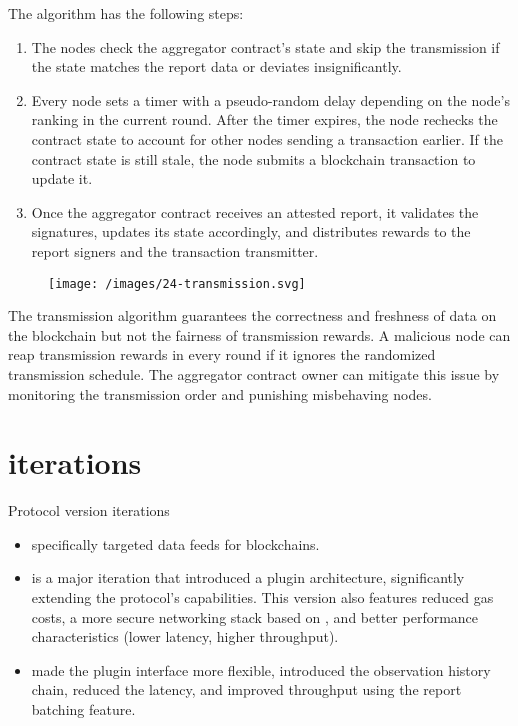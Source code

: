 \documentclass{article}
\begin{document}
The algorithm has the following steps:
\begin{enumerate}
    \item The nodes check the aggregator contract's state and skip the transmission if the state matches the report data or deviates insignificantly.
    \item Every node sets a timer with a pseudo-random delay depending on the node's ranking in the current round.
    After the timer expires, the node rechecks the contract state to account for other nodes sending a transaction earlier.
    If the contract state is still stale, the node submits a blockchain transaction to update it.
    \item Once the aggregator contract receives an attested report, it validates the signatures, updates its state accordingly, and distributes rewards to the report signers and the transaction transmitter.
\end{enumerate}
\begin{figure}[grayscale-diagram,medium-size]
\texttt{[image: /images/24-transmission.svg]}
\end{figure}

The transmission algorithm guarantees the correctness and freshness of data on the blockchain but not the fairness of transmission rewards.
A malicious node can reap transmission rewards in every round if it ignores the randomized transmission schedule.
The aggregator contract owner can mitigate this issue by monitoring the transmission order and punishing misbehaving nodes.

\section{iterations}{Protocol version iterations}
\begin{itemize}
    \item {} specifically targeted data feeds for  blockchains.
    \item {} is a major iteration that introduced a plugin architecture, significantly extending the protocol's capabilities.
    This version also features reduced gas costs, a more secure  networking stack based on , and better performance characteristics (lower latency, higher throughput).
    \item {} made the plugin interface more flexible, introduced the observation history chain, reduced the latency, and improved throughput using the report batching feature.
\end{itemize}
\end{document}
